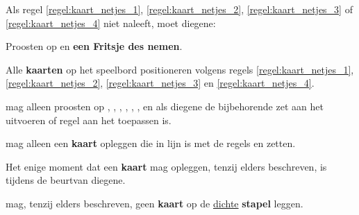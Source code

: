 \vervolgLijst{}
\item Als \eenSpeler regel \ref{regel:kaart_netjes_1}, \ref{regel:kaart_netjes_2}, \ref{regel:kaart_netjes_3} of \ref{regel:kaart_netjes_4} niet naleeft, moet diegene:
\puntLijst{}
\item Proosten op  en \textbf{een Fritsje des nemen}\footnotemark[2].
\item Alle \textbf{kaarten} op het speelbord positioneren volgens regels \ref{regel:kaart_netjes_1}, \ref{regel:kaart_netjes_2}, \ref{regel:kaart_netjes_3} en \ref{regel:kaart_netjes_4}.
\eindPuntLijst{}
\eindLijst{}


\vervolgLijst{}
\item \EenSpeler mag alleen proosten op , , , , , ,  en  als diegene de bijbehorende zet aan het uitvoeren of regel aan het toepassen is\footnotemark[3].
\eindLijst{}



\newpage
{}


\vervolgLijst{}
\item \EenSpeler mag alleen een \textbf{kaart} opleggen die in lijn is met de regels en zetten.
\label{regel:ongeldige_zet}
\eindLijst{}

\vervolgLijst{}
\item Het enige moment dat \eenSpeler een \textbf{kaart} mag opleggen, tenzij elders beschreven, is tijdens de beurt\footnotemark[1] van diegene.
\label{regel:voor_beurt_opleggen}
\eindLijst{}

\vervolgLijst{}
\item \EenSpeler mag, tenzij elders beschreven, geen \textbf{kaart} op de \ul{dichte} \textbf{stapel} leggen.
\label{regel:leggen_op_dichte_stapel}
\eindLijst{}


